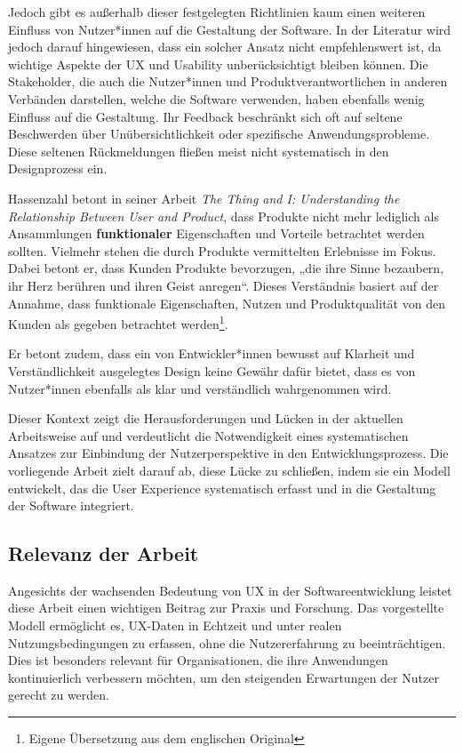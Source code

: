 \documentclass[12pt,oneside]{article}
\begin{document}
Jedoch gibt es außerhalb dieser festgelegten Richtlinien kaum einen weiteren Einfluss von Nutzer*innen auf die Gestaltung der Software. In der Literatur wird jedoch darauf hingewiesen, dass ein solcher Ansatz nicht empfehlenswert ist, da wichtige Aspekte der UX und Usability unberücksichtigt bleiben können. Die Stakeholder, die auch die Nutzer*innen und Produktverantwortlichen in anderen Verbänden darstellen, welche die Software verwenden, haben ebenfalls wenig Einfluss auf die Gestaltung. Ihr Feedback beschränkt sich oft auf seltene Beschwerden über Unübersichtlichkeit oder spezifische Anwendungsprobleme. Diese seltenen Rückmeldungen fließen meist nicht systematisch in den Designprozess ein.

Hassenzahl betont  in seiner Arbeit \textit{The Thing and I: Understanding the Relationship Between User and Product}, dass Produkte nicht mehr lediglich als Ansammlungen \textbf{funktionaler}     Eigenschaften und Vorteile betrachtet werden sollten. Vielmehr stehen die durch Produkte vermittelten Erlebnisse im Fokus. Dabei betont er, dass Kunden Produkte bevorzugen, „die ihre Sinne bezaubern, ihr Herz berühren und ihren Geist anregen“. Dieses Verständnis basiert auf der Annahme, dass funktionale Eigenschaften, Nutzen und Produktqualität von den Kunden als gegeben betrachtet werden\cite{Hassenzahlthething}\footnote{Eigene Übersetzung aus dem englischen Original}.

Er betont zudem, dass ein von Entwickler*innen bewusst auf Klarheit und Verständlichkeit ausgelegtes Design keine Gewähr dafür bietet, dass es von Nutzer*innen ebenfalls als klar und verständlich wahrgenommen wird.


Dieser Kontext zeigt die Herausforderungen und Lücken in der aktuellen Arbeitsweise auf und verdeutlicht die Notwendigkeit eines systematischen Ansatzes zur Einbindung der Nutzerperspektive in den Entwicklungsprozess. Die vorliegende Arbeit zielt darauf ab, diese Lücke zu schließen, indem sie ein Modell entwickelt, das die User Experience systematisch erfasst und in die Gestaltung der Software integriert.
\subsection{Relevanz der Arbeit}

Angesichts der wachsenden Bedeutung von UX in der Softwareentwicklung leistet diese Arbeit einen wichtigen Beitrag zur Praxis und Forschung. Das vorgestellte Modell ermöglicht es, UX-Daten in Echtzeit und unter realen Nutzungsbedingungen zu erfassen, ohne die Nutzererfahrung zu beeinträchtigen. Dies ist besonders relevant für Organisationen, die ihre Anwendungen kontinuierlich verbessern möchten, um den steigenden Erwartungen der Nutzer gerecht zu werden.
\end{document}
